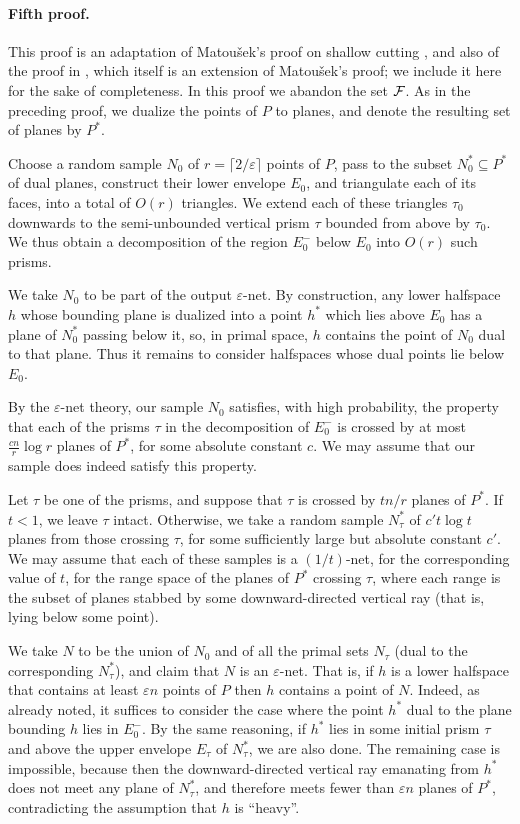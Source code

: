 \documentclass[12pt]{article}
\newcommand{\eps}{{\varepsilon}}
\providecommand{\Matousek}{Matou{\v s}ek\xspace}
\def\F{{\cal F}}
\begin{document}
\paragraph{Fifth proof.}
This proof is an adaptation of \Matousek's proof on shallow cutting
\cite[Section 5]{m-rph-92}, and also of the proof in
\cite{cv-iaags-07}, which itself is an extension of \Matousek's proof;
we include it here for the sake of completeness.  In this proof we
abandon the set $\F$.  As in the preceding proof, we dualize the
points of $P$ to planes, and denote the resulting set of planes by
$P^*$.

Choose a random sample $N_0$ of $r=\lceil 2/\eps\rceil$ points
of $P$, pass to the subset $N_0^*\subseteq P^*$ of dual planes,
construct their lower envelope $E_0$, and triangulate each of its
faces, into a total of $O(r)$ triangles. We extend each of these
triangles $\tau_0$ downwards to the semi-unbounded vertical prism $\tau$
bounded from above by $\tau_0$. We thus obtain a decomposition
of the region $E_0^-$ below $E_0$ into $O(r)$ such prisms.

We take $N_0$ to be part of the output $\eps$-net.  By construction,
any lower halfspace $h$ whose bounding plane is dualized into a point
$h^*$ which lies above $E_0$ has a plane of $N_0^*$ passing below it,
so, in primal space, $h$ contains the point of $N_0$ dual to that
plane.  Thus it remains to consider halfspaces whose dual points lie
below $E_0$.

By the $\eps$-net theory, our sample $N_0$ satisfies, with high
probability, the property that each of the prisms $\tau$ in the
decomposition of $E_0^-$ is crossed by at most $\frac{cn}{r}\log r$
planes of $P^*$, for some absolute constant $c$.
We may assume that our sample does indeed satisfy this property.

Let $\tau$ be one of the prisms, and suppose that $\tau$ is crossed
by $tn/r$ planes of $P^*$. If $t< 1$, we leave $\tau$ intact.
Otherwise, we take a random sample $N^*_\tau$ of $c't\log t$ planes
from those crossing $\tau$, for some sufficiently large but absolute
constant $c'$. We may assume that each of these samples is a
$(1/t)$-net, for the corresponding value of $t$, for the range space
of the planes of $P^*$ crossing $\tau$, where each range is the subset
of planes stabbed by some downward-directed vertical ray (that is, lying below some point).

We take $N$ to be the union of $N_0$ and of all the primal sets
$N_\tau$ (dual to the corresponding $N^*_\tau$),
and claim that $N$ is an $\eps$-net. That
is, if $h$ is a lower halfspace that contains at least $\eps n$ points
of $P$ then $h$ contains a point of $N$. Indeed, as already noted,
it suffices to consider the case where the point $h^*$ dual to the
plane bounding $h$ lies in $E_0^-$. By the same reasoning, if $h^*$
lies in some initial prism $\tau$ and above the upper envelope
$E_\tau$ of $N^*_\tau$, we are also done. The remaining case is
impossible, because then the downward-directed vertical ray emanating
from $h^*$ does not meet any plane of $N^*_\tau$, and therefore meets
fewer than $\eps n$ planes of $P^*$, contradicting the assumption that
$h$ is ``heavy''.
\end{document}
